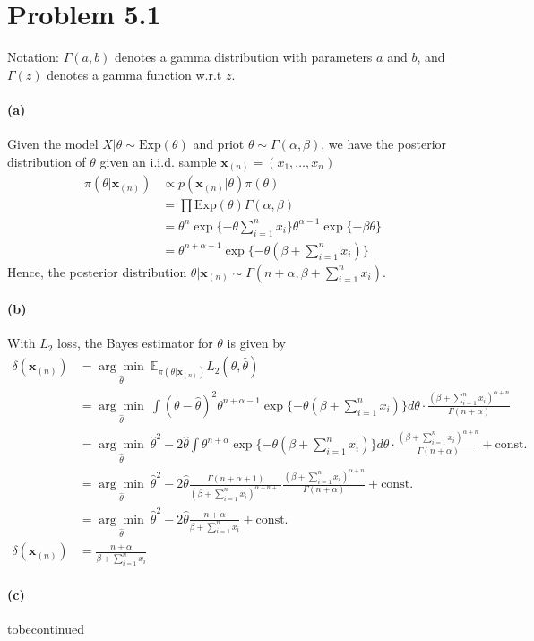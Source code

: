 \section{Problem 5.1}
Notation: $\Gamma(a, b)$ denotes a gamma distribution with parameters $a$ and $b$, and $\Gamma(z)$ denotes a gamma function w.r.t $z$.

\paragraph{(a)}
Given the model $X \vert \theta \sim \mathrm{Exp}(\theta)$ and priot $\theta \sim \Gamma(\alpha, \beta)$, we have the posterior distribution of $\theta$ given an i.i.d. sample $\bm{x}_{(n)} = (x_1, \dots, x_n)$
\begin{align*}
    \pi(\theta \vert \bm{x}_{(n)}) &\propto p(\bm{x}_{(n)} \vert \theta) \pi(\theta) \\
    &= \prod \mathrm{Exp}(\theta) \Gamma(\alpha, \beta)\\
    &= \theta^n \exp \{-\theta \sum_{i=1}^{n} x_i\} \theta^{\alpha-1} \exp \{ -\beta \theta\}\\
    &= \theta^{n+\alpha-1} \exp\{-\theta (\beta + \sum_{i=1}^{n} x_i)\}
\end{align*}
Hence, the posterior distribution $\theta \vert \bm{x}_{(n)} \sim \Gamma(n+\alpha, \beta + \sum_{i=1}^{n}x_i)$.

\paragraph{(b)}
With $L_2$ loss, the Bayes estimator for $\theta$ is given by
\begin{align*}
    \delta(\bm{x}_{(n)})
    &= \underset{\hat{\theta}}{\arg\min}\ \mathbb{E}_{\pi(\theta \vert \bm{x}_{(n)})} L_2(\theta, \hat{\theta})\\
    &= \underset{\hat{\theta}}{\arg\min}\ \int (\theta - \hat{\theta})^2 \theta^{n+\alpha-1} \exp\{-\theta (\beta + \sum_{i=1}^{n} x_i)\} d\theta \cdot \frac{(\beta+\sum_{i=1}^{n}x_i)^{\alpha+n}}{\Gamma(n+\alpha)}\\
    &= \underset{\hat{\theta}}{\arg\min}\ \hat{\theta}^2 - 2\hat{\theta} \int \theta^{n+\alpha} \exp\{-\theta (\beta + \sum_{i=1}^{n} x_i)\} d\theta \cdot \frac{(\beta+\sum_{i=1}^{n}x_i)^{\alpha+n}}{\Gamma(n+\alpha)} + \mathrm{const.}\\
    &= \underset{\hat{\theta}}{\arg\min}\ \hat{\theta}^2 - 2\hat{\theta} \frac{\Gamma(n+\alpha+1)}{(\beta+\sum_{i=1}^{n}x_i)^{\alpha+n+1}} \frac{(\beta+\sum_{i=1}^{n}x_i)^{\alpha+n}}{\Gamma(n+\alpha)} + \mathrm{const.}\\
    &= \underset{\hat{\theta}}{\arg\min}\ \hat{\theta}^2 - 2\hat{\theta} \frac{n+\alpha}{\beta + \sum_{i=1}^n x_i} + \mathrm{const.}\\
    \delta(\bm{x}_{(n)})
    &= \frac{n+\alpha}{\beta + \sum_{i=1}^n x_i}
\end{align*}

\paragraph{(c)}
{\color{red} tobecontinued}